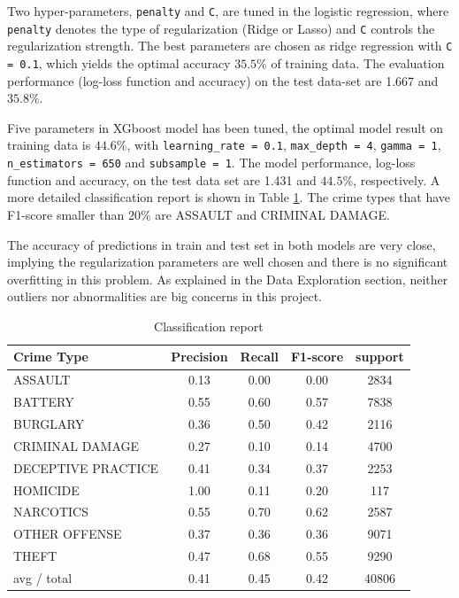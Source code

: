 \documentclass[12pt]{article}
\begin{document}
Two hyper-parameters, \verb|penalty| and \verb|C|, are tuned in the logistic regression, where \verb|penalty| denotes the type of regularization (Ridge or Lasso) and \verb|C| controls the regularization strength. The best parameters are chosen as ridge regression with \verb|C = 0.1|, which yields the optimal accuracy $35.5\%$ of training data. The evaluation performance (log-loss function and accuracy) on the test data-set are 1.667 and $35.8\%$.  

Five parameters in XGboost model has been tuned, the optimal model result on training data is $44.6\%$, with \verb|learning_rate = 0.1|, \verb|max_depth = 4|, \verb|gamma = 1|, \verb|n_estimators = 650| and \verb|subsample = 1|. The model performance, log-loss function and accuracy, on the test data set are 1.431 and $44.5\%$, respectively. A more detailed classification report is shown in Table \ref{tab:report}. The crime types that have F1-score smaller than $20\%$ are ASSAULT and CRIMINAL DAMAGE.
 
The accuracy of predictions in train and test set in both models are very close, implying the regularization parameters are well chosen and there is no significant overfitting  in this problem. As explained in the Data Exploration section, neither outliers nor abnormalities are big concerns in this project. 


 
\begin{table}
\caption{Classification report}
\label{tab:report}
\begin{center}
\begin{tabular}{l|c|c|c|c}
\hline
\bf Crime Type&        \bf Precision&    \bf Recall&  \bf F1-score&    \bf support\\
\hline
           ASSAULT&       0.13&      0.00&      0.00     & 2834\\
           BATTERY&       0.55 &     0.60 &     0.57     & 7838\\
          BURGLARY&       0.36 &     0.50  &    0.42     & 2116\\
   CRIMINAL DAMAGE&       0.27  &    0.10   &   0.14     & 4700\\
DECEPTIVE PRACTICE &      0.41   &   0.34 &  0.37     & 2253\\
          HOMICIDE  &     1.00    &  0.11  &    0.20      & 117\\
         NARCOTICS   &    0.55     & 0.70   &   0.62     & 2587\\
     OTHER OFFENSE    &   0.37  &0.36      &0.36      &9071\\
             THEFT     &  0.47   &   0.68   &   0.55     & 9290\\
\hline
       avg / total      & 0.41    &  0.45    &  0.42    & 40806\\
\hline
\end{tabular}
\end{center}
\end{table}
\end{document}
